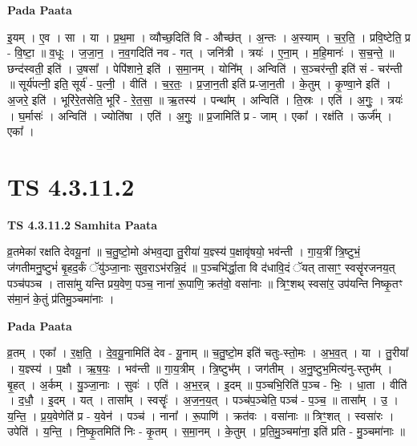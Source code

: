 \documentclass[17pt]{extarticle}
\begin{document}
\textbf{Pada Paata} \newline

इ॒यम् । ए॒व । सा । या । प्र॒थ॒मा । व्यौच्छ॒दिति॑ वि - औच्छ॑त् । अ॒न्तः । अ॒स्याम् । च॒र॒ति॒ । प्रवि॒ष्टेति॒ प्र - वि॒ष्टा॒ ॥ व॒धूः । ज॒जा॒न॒ । न॒व॒गदिति॑ नव - गत् । जनि॑त्री । त्रयः॑ । ए॒ना॒म् । म॒हि॒मानः॑ । स॒च॒न्ते॒ ॥ छन्द॑स्वती॒ इति॑ । उ॒षसा᳚ । पेपि॑शाने॒ इति॑ । स॒मा॒नम् । योनि᳚म् । अन्विति॑ । स॒ञ्चर॑न्ती॒ इति॑ सं - चर॑न्ती ॥ सूर्य॑पत्नी॒ इति॒ सूर्य॑ - प॒त्नी॒ । वीति॑ । च॒र॒तः॒ । प्र॒जा॒न॒ती इति॑ प्र-जा॒न॒ती । के॒तुम् । कृ॒ण्वा॒ने इति॑ । अ॒जरे॒ इति॑ । भूरि॑रे॒तसेति॒ भूरि॑ - रे॒त॒सा॒ ॥ ऋ॒तस्य॑ । पन्था᳚म् । अन्विति॑ । ति॒स्रः । एति॑ । अ॒गुः॒ । त्रयः॑ । घ॒र्मासः॑ । अन्विति॑ । ज्योति॑षा । एति॑ । अ॒गुः॒ ॥ प्र॒जामिति॑ प्र - जाम् । एका᳚ । रक्ष॑ति । ऊर्ज᳚म् । एका᳚ ।  \newline




\section*{ TS 4.3.11.2 }

\textbf{TS 4.3.11.2 } \newline
\textbf{Samhita Paata} \newline

व्र॒तमेका॑ रक्षति देवयू॒नां ॥ च॒तु॒ष्टो॒मो अ॑भव॒द्या तु॒रीया॑ य॒ज्ञ्स्य॑ प॒क्षावृ॑षयो॒ भव॑न्ती । गा॒य॒त्रीं त्रि॒ष्टुभं॒ ज॑गतीमनु॒ष्टुभं॑ बृ॒हद॒र्कं ॅयु॑ञ्जा॒नाः सुव॒राऽभ॑रन्नि॒दं ॥ प॒ञ्चभि॑र्द्धा॒ता वि द॑धावि॒दं ॅयत् तासाꣳ॒॒ स्वसॄ॑रजनय॒त् पञ्च॑पञ्च । तासा॑मु यन्ति प्रय॒वेण॒ पञ्च॒ नाना॑ रू॒पाणि॒ क्रत॑वो॒ वसा॑नाः ॥ त्रिꣳ॒॒शथ् स्वसा॑र॒ उप॑यन्ति निष्कृ॒तꣳ स॑मा॒नं के॒तुं प्र॑तिमु॒ञ्चमा॑नाः । \newline

\textbf{Pada Paata} \newline

व्र॒तम् । एका᳚ । र॒क्ष॒ति॒ । दे॒व॒यू॒नामिति॑ देव - यू॒नाम् ॥ च॒तु॒ष्टो॒म इति॑ चतुः-स्तो॒मः । अ॒भ॒व॒त् । या । तु॒रीया᳚ । य॒ज्ञ्स्य॑ । प॒क्षौ । ऋ॒ष॒यः॒ । भव॑न्ती ॥ गा॒य॒त्रीम् । त्रि॒ष्टुभ᳚म् । जग॑तीम् । अ॒नु॒ष्टुभ॒मित्य॑नु-स्तुभ᳚म् । बृ॒हत् । अ॒र्कम् । यु॒ञ्जा॒नाः । सुवः॑ । एति॑ । अ॒भ॒र॒न्न् । इ॒दम् ॥ प॒ञ्चभि॒रिति॑ प॒ञ्च - भिः॒ । धा॒ता । वीति॑ । द॒धौ॒ । इ॒दम् । यत् । तासा᳚म् । स्वसॄः᳚ । अ॒ज॒न॒य॒त् । पञ्च॑प॒ञ्चेति॒ पञ्च॑ - प॒ञ्च॒ ॥ तासा᳚म् । उ॒ । य॒न्ति॒ । प्र॒य॒वेणेति॑ प्र - य॒वेन॑ । पञ्च॑ । नाना᳚ । रू॒पाणि॑ । क्रत॑वः । वसा॑नाः ॥ त्रिꣳ॒॒शत् । स्वसा॑रः । उपेति॑ । य॒न्ति॒ । नि॒ष्कृ॒तमिति॑ निः - कृ॒तम् । स॒मा॒नम् । के॒तुम् । प्र॒ति॒मु॒ञ्चमा॑ना॒ इति॑ प्रति - मु॒ञ्चमा॑नाः ॥  \newline
\end{document}
